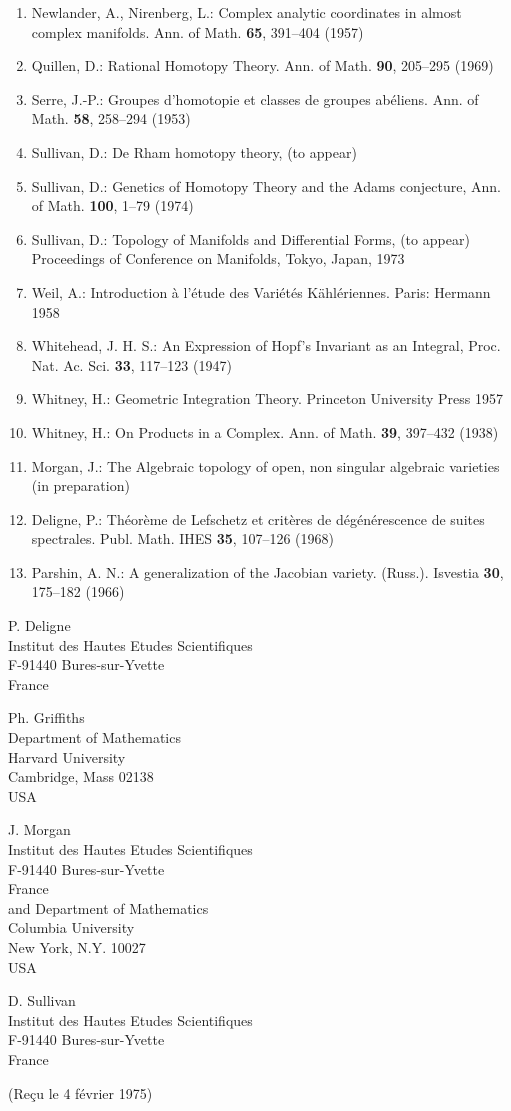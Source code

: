 \documentclass[
  french,
  a3paper,
  a3paper]{extarticle}
\begin{document}
\begin{enumerate}
  Also Amer. Math. Soc. Translations, ser. 2 vol.~63 (1967)
\item
  Newlander, A., Nirenberg, L.: Complex analytic coordinates in almost
  complex manifolds. Ann. of Math. \textbf{65}, 391--404 (1957)
\item
  Quillen, D.: Rational Homotopy Theory. Ann. of Math. \textbf{90},
  205--295 (1969)
\item
  Serre, J.-P.: Groupes d'homotopie et classes de groupes abéliens. Ann.
  of Math. \textbf{58}, 258--294 (1953)
\item
  Sullivan, D.: De Rham homotopy theory, (to appear)
\item
  Sullivan, D.: Genetics of Homotopy Theory and the Adams conjecture,
  Ann. of Math. \textbf{100}, 1--79 (1974)
\item
  Sullivan, D.: Topology of Manifolds and Differential Forms, (to
  appear) Proceedings of Conference on Manifolds, Tokyo, Japan, 1973
\item
  Weil, A.: Introduction à l'étude des Variétés Kählériennes. Paris:
  Hermann 1958
\item
  Whitehead, J. H. S.: An Expression of Hopf's Invariant as an Integral,
  Proc. Nat. Ac. Sci. \textbf{33}, 117--123 (1947)
\item
  Whitney, H.: Geometric Integration Theory. Princeton University Press
  1957
\item
  Whitney, H.: On Products in a Complex. Ann. of Math. \textbf{39},
  397--432 (1938)
\item
  Morgan, J.: The Algebraic topology of open, non singular algebraic
  varieties (in preparation)
\item
  Deligne, P.: Théorème de Lefschetz et critères de dégénérescence de
  suites spectrales. Publ. Math. IHES \textbf{35}, 107--126 (1968)
\item
  Parshin, A. N.: A generalization of the Jacobian variety. (Russ.).
  Isvestia \textbf{30}, 175--182 (1966)
\end{enumerate}

P. Deligne\\
Institut des Hautes Etudes Scientifiques\\
F-91440 Bures-sur-Yvette\\
France

Ph. Griffiths\\
Department of Mathematics\\
Harvard University\\
Cambridge, Mass 02138\\
USA

J. Morgan\\
Institut des Hautes Etudes Scientifiques\\
F-91440 Bures-sur-Yvette\\
France\\
and Department of Mathematics\\
Columbia University\\
New York, N.Y. 10027\\
USA

D. Sullivan\\
Institut des Hautes Etudes Scientifiques\\
F-91440 Bures-sur-Yvette\\
France

(Reçu le 4 février 1975)
\end{document}
